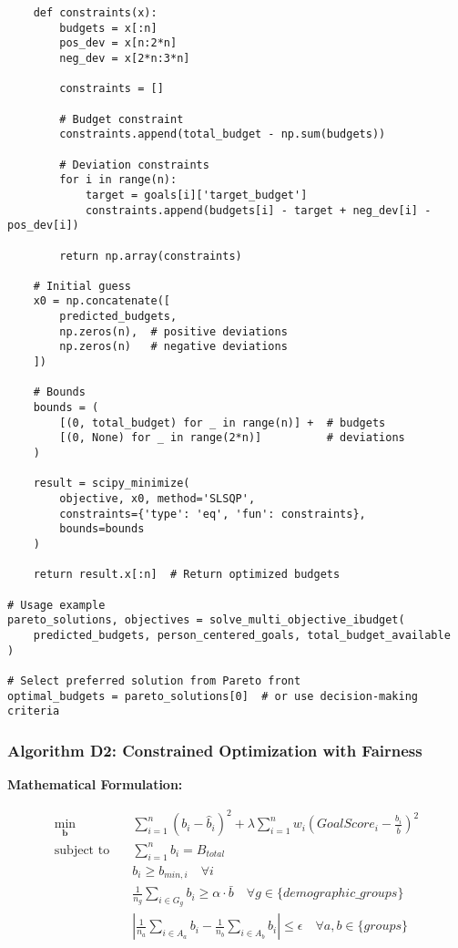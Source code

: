 \documentclass[12pt]{article}
\begin{document}
\begin{lstlisting}
    def constraints(x):
        budgets = x[:n]
        pos_dev = x[n:2*n]
        neg_dev = x[2*n:3*n]
        
        constraints = []
        
        # Budget constraint
        constraints.append(total_budget - np.sum(budgets))
        
        # Deviation constraints
        for i in range(n):
            target = goals[i]['target_budget']
            constraints.append(budgets[i] - target + neg_dev[i] - pos_dev[i])
        
        return np.array(constraints)
    
    # Initial guess
    x0 = np.concatenate([
        predicted_budgets,
        np.zeros(n),  # positive deviations
        np.zeros(n)   # negative deviations
    ])
    
    # Bounds
    bounds = (
        [(0, total_budget) for _ in range(n)] +  # budgets
        [(0, None) for _ in range(2*n)]          # deviations
    )
    
    result = scipy_minimize(
        objective, x0, method='SLSQP',
        constraints={'type': 'eq', 'fun': constraints},
        bounds=bounds
    )
    
    return result.x[:n]  # Return optimized budgets

# Usage example
pareto_solutions, objectives = solve_multi_objective_ibudget(
    predicted_budgets, person_centered_goals, total_budget_available
)

# Select preferred solution from Pareto front
optimal_budgets = pareto_solutions[0]  # or use decision-making criteria
\end{lstlisting}

\subsubsection{Algorithm D2: Constrained Optimization with Fairness}

\textbf{Mathematical Formulation:}

\begin{align}
\min_{\mathbf{b}} \quad & \sum_{i=1}^n \left(b_i - \hat{b}_i\right)^2 + \lambda \sum_{i=1}^n w_i \left(GoalScore_i - \frac{b_i}{\bar{b}}\right)^2 \\
\text{subject to} \quad & \sum_{i=1}^n b_i = B_{total} \\
& b_i \geq b_{min,i} \quad \forall i \\
& \frac{1}{n_g} \sum_{i \in G_g} b_i \geq \alpha \cdot \bar{b} \quad \forall g \in \{demographic\_groups\} \\
& \left|\frac{1}{n_a} \sum_{i \in A_a} b_i - \frac{1}{n_b} \sum_{i \in A_b} b_i\right| \leq \epsilon \quad \forall a,b \in \{groups\}
\end{align}
\end{document}
